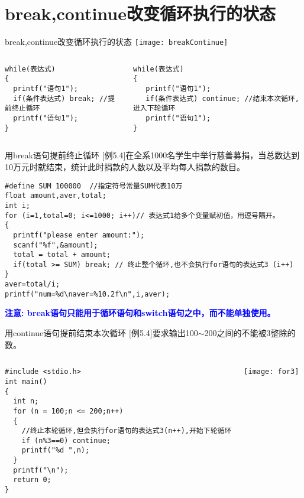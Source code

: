 \section{break,continue改变循环执行的状态}

\begin{frame}{break,continue改变循环执行的状态}
\centering
\texttt{[image: breakContinue]}
\begin{columns}[T]
\begin{lstlisting}
while(表达式)
{
  printf("语句1");
  if(条件表达式) break; //提前终止循环
  printf("语句1");
}
\end{lstlisting}
\begin{lstlisting}[frame=leftline]
while(表达式)
{
   printf("语句1");
   if(条件表达式) continue; //结束本次循环, 进入下轮循环
   printf("语句1");
}
\end{lstlisting}
\end{columns}
\end{frame}

\begin{frame}{用break语句提前终止循环}
$[$例5.4$]$在全系1000名学生中举行慈善募捐，当总数达到10万元时就结束，统计此时捐款的人数以及平均每人捐款的数目。
\begin{lstlisting}
#define SUM 100000  //指定符号常量SUM代表10万
float amount,aver,total; 
int i;
for (i=1,total=0; i<=1000; i++)// 表达式1给多个变量赋初值，用逗号隔开。
{
  printf("please enter amount:");
  scanf("%f",&amount);
  total = total + amount; 
  if(total >= SUM) break; // 终止整个循环,也不会执行for语句的表达式3 (i++)
}
aver=total/i;
printf("num=%d\naver=%10.2f\n",i,aver); 
\end{lstlisting}
\textbf{\textcolor{blue}{注意: break语句只能用于循环语句和switch语句之中，而不能单独使用。}}
\end{frame}

\begin{frame}{用continue语句提前结束本次循环}
$[$例5.4$]$要求输出100$\sim$200之间的不能被3整除的数。
\vspace{-0.3cm}
\begin{columns}
\begin{lstlisting}
#include <stdio.h>
int main()
{
  int n;
  for (n = 100;n <= 200;n++)
  {
    //终止本轮循环,但会执行for语句的表达式3(n++),开始下轮循环
    if (n%3==0) continue;
    printf("%d ",n);
  }
  printf("\n");
  return 0;
} 
\end{lstlisting}
\texttt{[image: for3]}
\end{columns}
\end{frame}

